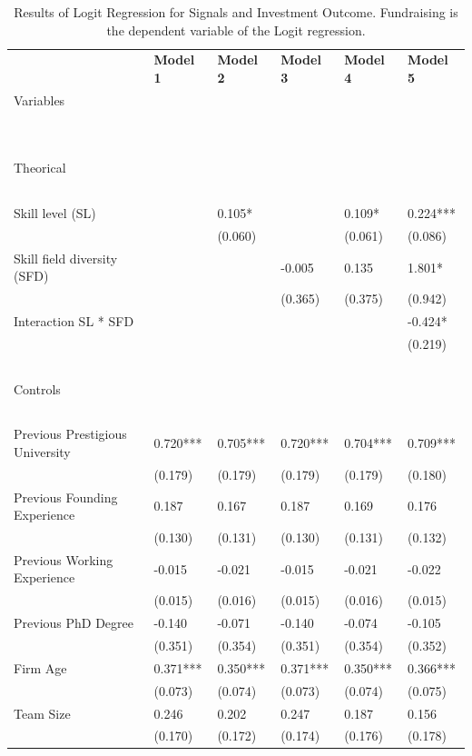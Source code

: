 \documentclass[12pt]{article}
\begin{document}
\begin{table}[!ht]
\scriptsize
    \centering
    \caption{Results of Logit Regression for Signals and Investment Outcome. Fundraising is the dependent variable of the Logit regression.}
    \begin{tabular}{llllll}
        \toprule
        ~ & \textbf{Model 1} & \textbf{Model 2} & \textbf{Model 3} & \textbf{Model 4} & \textbf{Model 5} \\
        Variables & ~ & ~ & ~ & ~ & ~ \\
        ~ & ~ & ~ & ~ & ~ & ~ \\
        \midrule
        ~ & ~ & ~ & ~ & ~ & ~ \\
        Theorical & ~ & ~ & ~ & ~ & ~ \\
        & ~ & ~ & ~ & ~ & ~ \\
        Skill level (SL) & ~ & 0.105* & ~ & 0.109* & 0.224*** \\
        ~ & ~ & (0.060) & ~ & (0.061) & (0.086) \\
        Skill field diversity (SFD) & ~ & ~ & -0.005 & 0.135 & 1.801* \\
        ~ & ~ & ~ & (0.365) & (0.375) & (0.942) \\
        Interaction SL * SFD & ~ & ~ & ~ & ~ & -0.424* \\
        ~ & ~ & ~ & ~ & ~ & (0.219) \\
        ~ & ~ & ~ & ~ & ~ & ~ \\
        Controls & ~ & ~ & ~ & ~ & ~ \\
        & ~ & ~ & ~ & ~ & ~ \\
        Previous Prestigious University & 0.720*** & 0.705*** & 0.720*** & 0.704*** & 0.709*** \\
        ~ & (0.179) & (0.179) & (0.179) & (0.179) & (0.180) \\
        Previous Founding Experience & 0.187 & 0.167 & 0.187 & 0.169 & 0.176 \\
        ~ & (0.130) & (0.131) & (0.130) & (0.131) & (0.132) \\
        Previous Working Experience & -0.015 & -0.021 & -0.015 & -0.021 & -0.022 \\
        ~ & (0.015) & (0.016) & (0.015) & (0.016) & (0.015) \\
        Previous PhD Degree & -0.140 & -0.071 & -0.140 & -0.074 & -0.105 \\
        ~ & (0.351) & (0.354) & (0.351) & (0.354) & (0.352) \\
        Firm Age & 0.371*** & 0.350*** & 0.371*** & 0.350*** & 0.366*** \\
        ~ & (0.073) & (0.074) & (0.073) & (0.074) & (0.075) \\
        Team Size & 0.246 & 0.202 & 0.247 & 0.187 & 0.156 \\
        ~ & (0.170) & (0.172) & (0.174) & (0.176) & (0.178) \\


\end{tabular}
\end{table}
\end{document}
